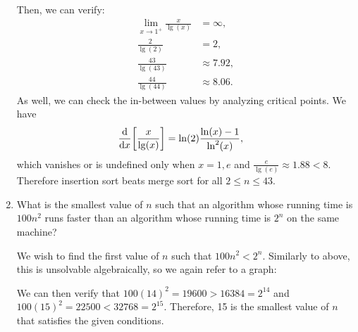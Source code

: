 \documentclass[Chapter01]{subfiles}
\begin{document}
\begin{enumerate}[leftmargin=\labelsep]
\begin{answer}
			Then, we can verify:
			\begin{align*}
				\lim_{x \to 1^+} \frac{x}{\lg(x)} &= \infty,\\
				\frac{2}{\lg(2)} &= 2,\\
				\frac{43}{\lg(43)} &\approx 7.92,\\
				\frac{44}{\lg(44)} &\approx 8.06.
			\end{align*}
			As well, we can check the in-between values by analyzing critical points. We have
			\begin{align*}
				\dv{}{x} \qty[\frac{x}{\lg(x)}] &= \ln(2)\frac{\ln(x) - 1}{\ln^2(x)},
			\end{align*}
			which vanishes or is undefined only when $x = 1,e$ and $\frac{e}{\lg(e)} \approx 1.88 < 8$. Therefore insertion sort beats merge sort for all $2 \leq n \leq 43$.
		\end{answer}

		\item What is the smallest value of $n$ such that an algorithm whose running time is $100n^2$ runs faster than an algorithm whose running time is $2^n$ on the same machine?
		\begin{answer}
			We wish to find the first value of $n$ such that $100n^2 < 2^n$. Similarly to above, this is unsolvable algebraically, so we again refer to a graph:\\

			\begin{figure}[h]
				\centering
			\end{figure}

			We can then verify that $100(14)^2 = \num{19600} > \num{16384} = 2^{14}$ and $100(15)^2 = \num{22500} < \num{32768} = 2^{15}$. Therefore, 15 is the smallest value of $n$ that satisfies the given conditions.
		\end{answer}
	\end{enumerate}
\end{document}

